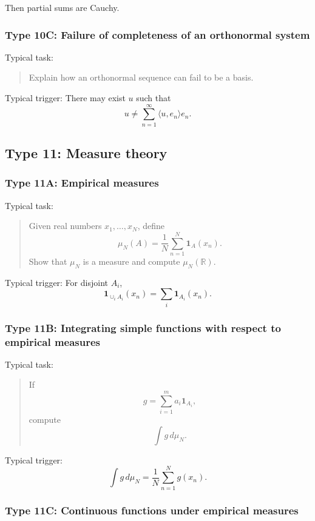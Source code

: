 Then partial sums are Cauchy.

\subsubsection*{Type 10C: Failure of completeness of an orthonormal system}

Typical task:
\begin{quote}
    Explain how an orthonormal sequence can fail to be a basis.
\end{quote}

Typical trigger: There may exist $u$ such that
\[
    u\neq \sum_{n=1}^\infty \langle u,e_n\rangle e_n.
\]

\subsection{Type 11: Measure theory}

\subsubsection*{Type 11A: Empirical measures}

Typical task:
\begin{quote}
    Given real numbers $x_1,\ldots,x_N$, define
    \[
        \mu_N(A)=\frac1N\sum_{n=1}^N \mathbf 1_A(x_n).
    \]
    Show that $\mu_N$ is a measure and compute $\mu_N(\mathbb R)$.
\end{quote}

Typical trigger: For disjoint $A_i$,
\[
    \mathbf 1_{\cup_i A_i}(x_n)
    =
    \sum_i \mathbf 1_{A_i}(x_n).
\]

\subsubsection*{Type 11B: Integrating simple functions with respect to empirical measures}

Typical task:
\begin{quote}
    If
    \[
        g=\sum_{i=1}^m a_i\mathbf 1_{A_i},
    \]
    compute
    \[
        \int g\,d\mu_N.
    \]
\end{quote}

Typical trigger:
\[
    \int g\,d\mu_N
    =
    \frac1N\sum_{n=1}^N g(x_n).
\]

\subsubsection*{Type 11C: Continuous functions under empirical measures}

